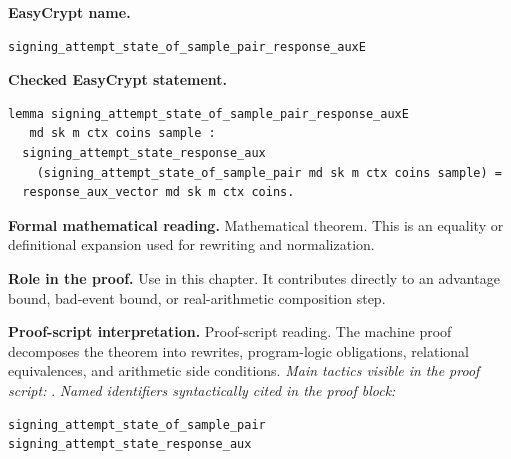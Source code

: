 \begin{formaltheorem}
\noindent\textbf{EasyCrypt name.}
\begin{lstlisting}[language=EasyCrypt,basicstyle=\ttfamily\scriptsize]
signing_attempt_state_of_sample_pair_response_auxE
\end{lstlisting}
\noindent\textbf{Checked EasyCrypt statement.}
\begin{lstlisting}[language=EasyCrypt,basicstyle=\ttfamily\scriptsize]
lemma signing_attempt_state_of_sample_pair_response_auxE
   md sk m ctx coins sample :
  signing_attempt_state_response_aux
    (signing_attempt_state_of_sample_pair md sk m ctx coins sample) =
  response_aux_vector md sk m ctx coins.
\end{lstlisting}
\noindent\textbf{Formal mathematical reading.}
Mathematical theorem. This is an equality or definitional expansion used for rewriting and normalization.

\noindent\textbf{Role in the proof.}
Use in this chapter. It contributes directly to an advantage bound, bad-event bound, or real-arithmetic composition step.

\noindent\textbf{Proof-script interpretation.}
Proof-script reading. The machine proof decomposes the theorem into rewrites, program-logic obligations, relational equivalences, and arithmetic side conditions.
\emph{Main tactics visible in the proof script:} .
\emph{Named identifiers syntactically cited in the proof block:}
\begin{lstlisting}[language=EasyCrypt,basicstyle=\ttfamily\scriptsize]
signing_attempt_state_of_sample_pair
signing_attempt_state_response_aux
\end{lstlisting}

\end{formaltheorem}

